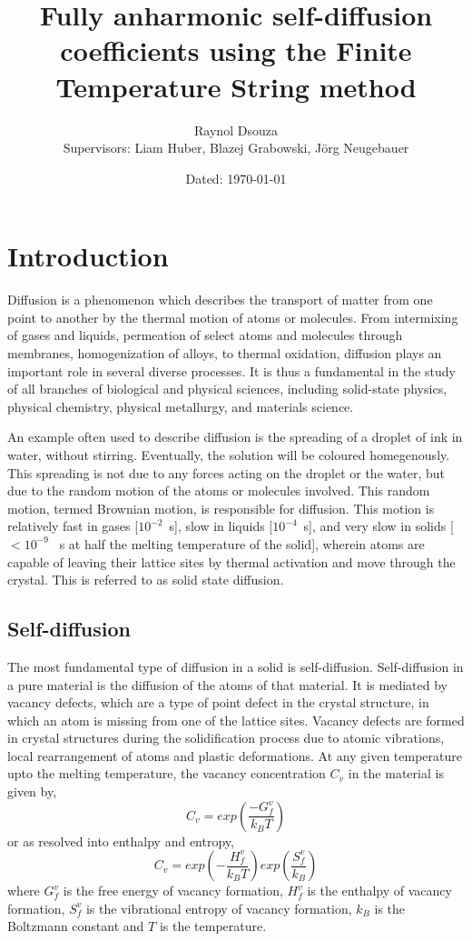\documentclass{report}
\title{Fully anharmonic self-diffusion coefficients using the Finite Temperature String method}
\date{\small Dated: \today}
\author{Raynol Dsouza\\[0.5cm] {Supervisors: Liam Huber, Blazej Grabowski, Jörg Neugebauer}}
\affil{Max Planck Institut für Eisenforschung, Düsseldorf}
\begin{document}
\maketitle
{}
\newpage
\tableofcontents
\newpage
{}

\chapter{Introduction}

Diffusion is a phenomenon which describes the transport of matter from one point to another by the thermal motion of atoms or molecules. From intermixing of gases and liquids, permeation of select atoms and molecules through membranes, homogenization of alloys, to thermal oxidation, diffusion plays an important role in several diverse processes. It is thus a fundamental in the study of all branches of biological and physical sciences, including solid-state physics, physical chemistry, physical metallurgy, and materials science. \par

An example often used to describe diffusion is the spreading of a droplet of ink in water, without stirring. Eventually, the solution will be coloured homegenously. This spreading is not due to any forces acting on the droplet or the water, but due to the random motion of the atoms or molecules involved. This random motion, termed Brownian motion, is responsible for diffusion. This motion is relatively fast in gases [$10^{-2}$\si{\per\second}], slow in liquids [$10^{-4}$\si{\per\second}], and very slow in solids [$<10^{-9}$ \si{\per\second} at half the melting temperature of the solid], wherein atoms are capable of leaving their lattice sites by thermal activation and move through the crystal. This is referred to as solid state diffusion.

\section{Self-diffusion}

The most fundamental type of diffusion in a solid is self-diffusion. Self-diffusion in a pure material is the diffusion of the atoms of that material. It is mediated by vacancy defects, which are a type of point defect in the crystal structure, in which an atom is missing from one of the lattice sites. Vacancy defects are formed in crystal structures during the solidification process due to atomic vibrations, local rearrangement of atoms and plastic deformations. At any given temperature upto the melting temperature, the vacancy concentration $C_v$ in the material is given by,
%
\begin{equation}
C_v = exp\left(\dfrac{-G^v_f}{k_B T}\right)
\end{equation}
%
or as resolved into enthalpy and entropy,
%
\begin{equation}
C_v = exp\left(-\dfrac{H^v_f}{k_B T}\right) exp\left(\dfrac{S^v_f}{k_B}\right)
\end{equation}
%
where $G^v_f$ is the free energy of vacancy formation, $H^v_f$ is the enthalpy of vacancy formation, $S^v_f$ is the vibrational entropy of vacancy formation, $k_B$ is the Boltzmann constant and $T$ is the temperature. 
\end{document}
